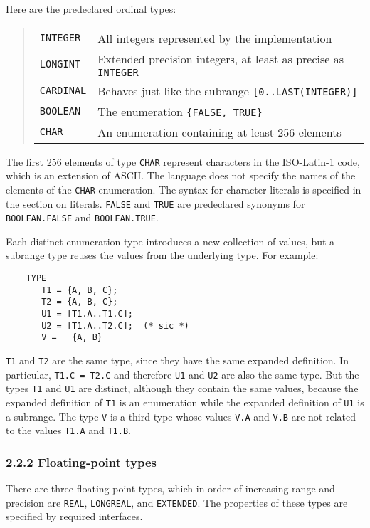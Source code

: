 \documentclass[10pt]{article}
\begin{document}
Here are the predeclared ordinal types:
\begin{quote}
  \begin{tabular}{ll}
    \verb|INTEGER|  & All integers represented by the implementation \\
    \verb|LONGINT|  & Extended precision integers, at least as precise as
                      \verb|INTEGER| \\
    \verb|CARDINAL| & Behaves just like the subrange \verb|[0..LAST(INTEGER)]|
    \\
    \verb|BOOLEAN|  & The enumeration \verb|{FALSE, TRUE}| \\
    \verb|CHAR|     & An enumeration containing at least 256 elements \\
  \end{tabular}
\end{quote}
The first 256 elements of type \verb|CHAR| represent characters in the
ISO-Latin-1 code, which is an extension of ASCII.  The language does not
specify the names of the elements of the \verb|CHAR| enumeration.  The syntax
for character literals is specified in the section on literals.  \verb|FALSE|
and \verb|TRUE| are predeclared synonyms for \verb|BOOLEAN.FALSE| and
\verb|BOOLEAN.TRUE|.

Each distinct enumeration type introduces a new collection of values, but a
subrange type reuses the values from the underlying type.  For example:
\begin{verbatim}
    TYPE
       T1 = {A, B, C};
       T2 = {A, B, C};
       U1 = [T1.A..T1.C];
       U2 = [T1.A..T2.C];  (* sic *)
       V =   {A, B}
\end{verbatim}
\verb|T1| and \verb|T2| are the same type, since they have the same expanded
definition.  In particular, \verb|T1.C = T2.C| and therefore \verb|U1| and
\verb|U2| are also the same type.  But the types \verb|T1| and \verb|U1| are
distinct, although they contain the same values, because the expanded
definition of \verb|T1| is an enumeration while the expanded definition of
\verb|U1| is a subrange.  The type \verb|V| is a third type whose values
\verb|V.A| and \verb|V.B| are not related to the values \verb|T1.A| and
\verb|T1.B|.

\subsubsection*{2.2.2 Floating-point types}

There are three floating point types, which in order of increasing range and
precision are \verb|REAL|, \verb|LONGREAL|, and \verb|EXTENDED|.  The
properties of these types are specified by required interfaces.
\end{document}
